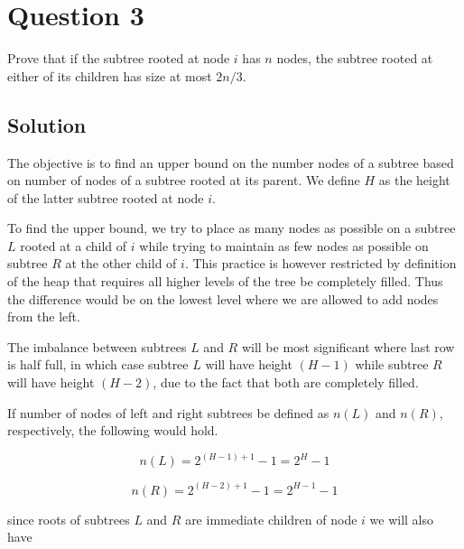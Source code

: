 
\section*{Question 3}

Prove that if the subtree rooted at node $i$ has $n$ nodes, the subtree rooted at either of its children has size at most $2n/3$.

\subsection*{Solution}

The objective is to find an upper bound on the number nodes of a subtree based on number of nodes of a subtree rooted at its parent.
We define $H$ as the height of the latter subtree rooted at node $i$.

To find the upper bound, we try to place as many nodes as possible on a subtree $L$ rooted at a child of $i$ while trying to maintain as few nodes as possible on subtree $R$ at the other child of $i$.
This practice is however restricted by definition of the heap that requires all higher levels of the tree be completely filled.
Thus the difference would be on the lowest level where we are allowed to add nodes from the left.

The imbalance between subtrees $L$ and $R$ will be most significant where last row is half full, in which case subtree $L$ will have height $(H-1)$ while subtree $R$ will have height $(H-2)$, due to the fact that both are completely filled.

If number of nodes of left and right subtrees be defined as $n(L)$ and $n(R)$, respectively, the following would hold.

\begin{equation}\label{eq31}
n(L) = 2^{(H-1)+1}-1 = 2^H - 1
\end{equation}

\begin{equation}\label{eq32}
n(R) = 2^{(H-2)+1}-1 = 2^{H-1} - 1
\end{equation}

since roots of subtrees $L$ and $R$ are immediate children of node $i$ we will also have


